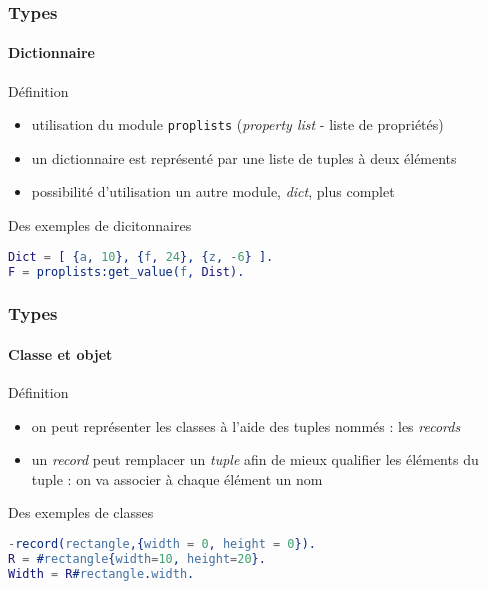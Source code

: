 \begin{frame}[fragile]
  \frametitle{Types}
  \framesubtitle{Dictionnaire}

  \begin{block}{Définition}
    \begin{itemize}
      \item utilisation du module \texttt{proplists} (\textit{property list}
        - liste de propriétés)
      \item un dictionnaire est représenté par une liste de tuples à deux
        éléments
      \item possibilité d'utilisation un autre module, \textit{dict},
        plus complet
    \end{itemize}
  \end{block}

  \begin{exampleblock}{Des exemples de dicitonnaires}
    \begin{lstlisting}[language=erlang]
Dict = [ {a, 10}, {f, 24}, {z, -6} ].
F = proplists:get_value(f, Dist).
    \end{lstlisting}
  \end{exampleblock}

\end{frame}

\begin{frame}[fragile]
  \frametitle{Types}
  \framesubtitle{Classe et objet}

  \begin{block}{Définition}
    \begin{itemize}
      \item on peut représenter les classes à l'aide des tuples nommés :
        les \textit{records}
      \item un \textit{record} peut remplacer un \textit{tuple} afin de
        mieux qualifier les éléments du tuple : on va associer à chaque
        élément un nom
    \end{itemize}
  \end{block}

  \begin{exampleblock}{Des exemples de classes}
    \begin{lstlisting}[language=erlang]
-record(rectangle,{width = 0, height = 0}).
R = #rectangle{width=10, height=20}.
Width = R#rectangle.width.
    \end{lstlisting}
  \end{exampleblock}

\end{frame}


